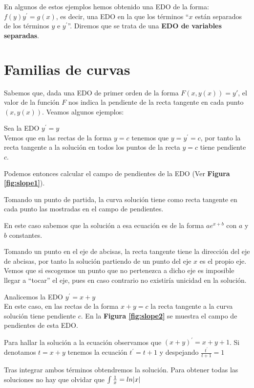 \documentclass{mathnotes}
\begin{document}
En algunos de estos ejemplos hemos obtenido una EDO de la forma: $f(y)y^\prime = g(x)$, es decir, una EDO en la que los términos ``$x$ están separados de los términos $y$ e $y^\prime$''. Diremos que se trata de una \textbf{EDO de variables separadas}. 

\section{Familias de curvas}

Sabemos que, dada una EDO de primer orden de la forma $F(x,y(x)) = y'$, el valor de la función $F$ nos indica la pendiente de la recta tangente en cada punto $(x, y(x))$.
Veamos algunos ejemplos:


\begin{example}
Sea la EDO $y^\prime = y$\\
Vemos que en las rectas de la forma $y=c$ tenemos que $y=y^\prime = c$, por tanto la recta tangente a la solución en todos los puntos de la recta $y=c$ tiene pendiente $c$.

Podemos entonces calcular el campo de pendientes de la EDO (Ver \textbf{Figura \ref{fig:slope1}}).

Tomando un punto de partida, la curva solución tiene como recta tangente en cada punto las mostradas en el campo de pendientes.

En este caso sabemos que la solución a esa ecuación es de la forma $ae^{x+b}$ con $a$ y $b$ constantes.

Tomando un punto en el eje de abcisas, la recta tangente tiene la dirección del eje de abcisas, por tanto la solución partiendo de un punto del eje $x$ es el propio eje. Vemos que si escogemos un punto que no pertenezca a dicho eje es imposible llegar a ``tocar'' el eje, pues en caso contrario no existiría unicidad en la solución.
\end{example}


\begin{example}
Analicemos la EDO $y^\prime = x+y$\\
En este caso, en las rectas de la forma $x+y=c$ la recta tangente a la curva solución tiene pendiente $c$.
En la \textbf{Figura \ref{fig:slope2}} se muestra el campo de pendientes de esta EDO.

Para hallar la solución a la ecuación observamos que $(x+y)^\prime = x+y+1$. Si denotamos $t=x+y$ tenemos la ecuación $t^\prime=t+1$ y despejando $\frac{t^\prime}{t+1} = 1$

Tras integrar ambos términos obtendremos la solución.
Para obtener todas las soluciones no hay que olvidar que $\int \frac{1}{x} = ln|x|$
\end{example}
\end{document}
